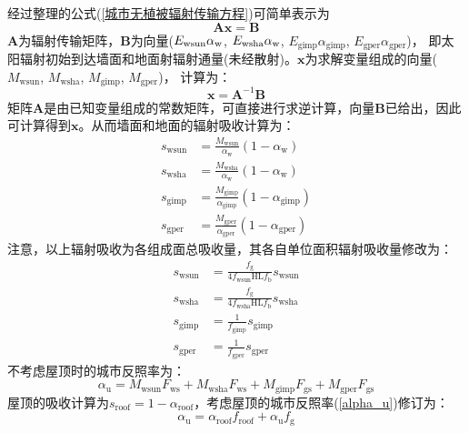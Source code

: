 经过整理的公式(\ref{城市无植被辐射传输方程})可简单表示为
\begin{equation}\label{mathbf_AX}
  \mathbf{A x}=\mathbf{B}
\end{equation}
$\mathbf{A}$为辐射传输矩阵，$\mathbf{B}$为向量($E_{\mathrm{wsun}}\alpha_{\rm w}$, $E_{\mathrm{wsha}}\alpha_{\rm w}$, $E_{\mathrm{gimp}}\alpha_{\mathrm{gimp}}$, $E_{\mathrm{gper}}\alpha_{\mathrm{gper}}$)，
即太阳辐射初始到达墙面和地面射辐射通量(未经散射)。$\mathbf{x}$为求解变量组成的向量(\allowbreak$M_{\mathrm{wsun}}$, \allowbreak$M_{\mathrm{wsha}}$, \allowbreak$M_{\mathrm{gimp}}$, \allowbreak$M_{\mathrm{gper}}$)，
计算为：
\begin{equation}\label{mathbf_X}
  \mathbf{x}=\mathbf{A}^{-1} \mathbf{B}
\end{equation}
矩阵$\mathbf{A}$是由已知变量组成的常数矩阵，可直接进行求逆计算，向量$\mathbf{B}$已给出，因此可计算得到$\mathbf{x}$。从而墙面和地面的辐射吸收计算为：
\begin{equation}\label{s_wsun_wsha_gimp_gper_1}
  \begin{aligned}s_{\mathrm{wsun}} &=\frac{M_{\mathrm{wsun}}}{\alpha_{\mathrm{w}}}\left(1-\alpha_{\mathrm{w}}\right) \\
    s_{\mathrm{wsha}} &=\frac{M_{\mathrm{wsha}}}{\alpha_{\mathrm{w}}}\left(1-\alpha_{\mathrm{w}}\right) \\
    s_{\mathrm{gimp}} &=\frac{M_{\mathrm{gimp}}}{\alpha_{\mathrm{gimp}}}\left(1-\alpha_{\mathrm{gimp}}\right) \\
  s_{\mathrm{gper}} &=\frac{M_{\mathrm{gper}}}{\alpha_{\mathrm{gper}}}\left(1-\alpha_{\mathrm{gper}}\right)\end{aligned}
\end{equation}
注意，以上辐射吸收为各组成面总吸收量，其各自单位面积辐射吸收量修改为：
\begin{equation}\label{s_wsun_wsha_gimp_gper_2}
  \begin{aligned}s_{\mathrm{wsun}} &=\frac{f_{\mathrm{g}}}{4 f_{\mathrm{wsun}} \mathrm{HL} f_{\mathrm{b}}} s_{\mathrm{wsun}} \\
    s_{\mathrm{wsha}} &=\frac{f_{\mathrm{g}}}{4 f_{\mathrm{wsha}} \mathrm{HL} f_{\mathrm{b}}} s_{\mathrm{wsha}} \\
    s_{\mathrm{gimp}} &=\frac{1}{f_{\mathrm{gimp}}} s_{\mathrm{gimp}} \\
  s_{\mathrm{gper}} &=\frac{1}{f_{\mathrm{gper}}} s_{\mathrm{gper}}\end{aligned}
\end{equation}
不考虑屋顶时的城市反照率为：
\begin{equation}\label{alpha_u}
  \alpha_{\mathrm{u}}=M_{\mathrm{wsun}} F_{\mathrm{ws}}+M_{\mathrm{wsha}} F_{\mathrm{ws}}+M_{\mathrm{gimp}} F_{\mathrm{gs}}+M_{\mathrm{gper}} F_{\mathrm{gs}}
\end{equation}
屋顶的吸收计算为$s_{\mathrm{roof}}=1-\alpha_{\mathrm{roof}}$，考虑屋顶的城市反照率(\ref{alpha_u})修订为：
\begin{equation}\label{alpha_u2}
  \alpha_{\mathrm{u}}=\alpha_{\mathrm{{roof }}} f_{\mathrm{roof}}+\alpha_{\mathrm{u}} f_{\mathrm{g}}
\end{equation}

